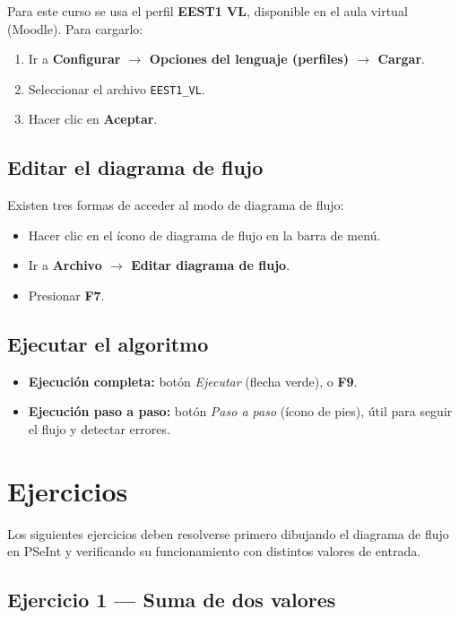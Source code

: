 Para este curso se usa el perfil \textbf{EEST1 VL}, disponible en el aula virtual (Moodle). Para cargarlo:

\begin{enumerate}
    \item Ir a \textbf{Configurar $\rightarrow$ Opciones del lenguaje (perfiles) $\rightarrow$ Cargar}.
    \item Seleccionar el archivo \texttt{EEST1\_VL}.
    \item Hacer clic en \textbf{Aceptar}.
\end{enumerate}

\subsection{Editar el diagrama de flujo}

Existen tres formas de acceder al modo de diagrama de flujo:

\begin{itemize}
    \item Hacer clic en el ícono de diagrama de flujo en la barra de menú.
    \item Ir a \textbf{Archivo $\rightarrow$ Editar diagrama de flujo}.
    \item Presionar \textbf{F7}.
\end{itemize}

\subsection{Ejecutar el algoritmo}

\begin{itemize}
    \item \textbf{Ejecución completa:} botón \textit{Ejecutar} (flecha verde), o \textbf{F9}.
    \item \textbf{Ejecución paso a paso:} botón \textit{Paso a paso} (ícono de pies), útil para seguir el flujo y detectar errores.
\end{itemize}

\section{Ejercicios}

Los siguientes ejercicios deben resolverse primero dibujando el diagrama de flujo en PSeInt y verificando su funcionamiento con distintos valores de entrada.

\subsection{Ejercicio 1 --- Suma de dos valores}


